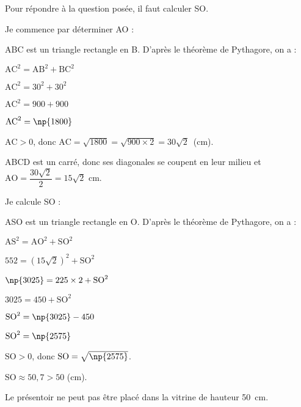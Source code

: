 
\medskip

Pour répondre à la question posée, il faut calculer SO.

Je commence par déterminer AO :

ABC est un triangle rectangle en B. D'après le théorème de Pythagore, on a :

$\text{AC}^2 = \text{AB}^2 + \text{BC}^2$

$\text{AC}^2 = 30^2 + 30^2$

$\text{AC}^2 = 900 + 900$

$\text{AC}^2 = \np{1800}$

$\text{AC} > 0$, donc $\text{AC} = \sqrt{1800} = \sqrt{900 \times 2} = 30\sqrt{2}$~(cm).

ABCD est un carré, donc ses diagonales se coupent en leur milieu et
$\text{AO} = \dfrac{30\sqrt{2}}{2} = 15\sqrt{2}$ cm.

Je calcule SO :

ASO est un triangle rectangle en O. D'après le théorème de Pythagore, on a :

$\text{AS}^2 = \text{AO}^2 + \text{SO}^2$

$552 = \left(15\sqrt{2}\right)^2 + \text{SO}^2$

$\np{3025} = 225 \times 2 + \text{SO}^2$

$3 025 = 450 + \text{SO}^2$

$\text{SO}^2 = \np{3025} - 450$

$\text{SO}^2 = \np{2575}$

$\text{SO} > 0$, donc $\text{SO} = \sqrt{\np{2575}}$.

$\text{SO} \approx  50,7> 50  $ (cm).

Le présentoir ne peut pas être placé dans la vitrine de hauteur 50~cm.

\vspace{0,5cm}

